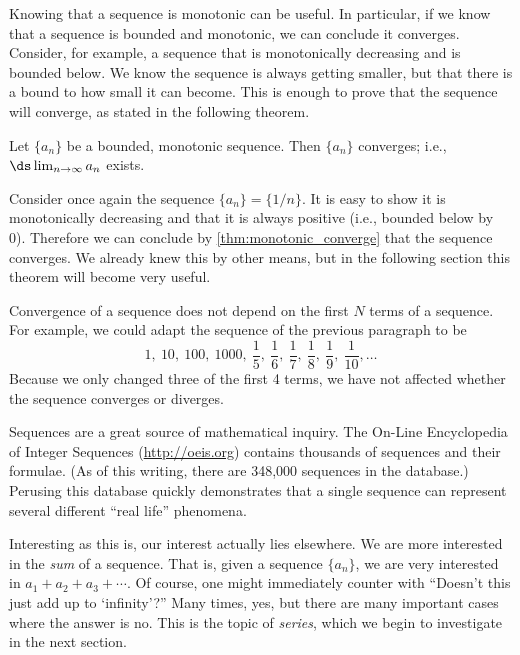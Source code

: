 Knowing that a sequence is monotonic can be useful. In particular, if we know that a sequence is bounded and monotonic, we can conclude it converges. Consider, for example, a sequence that is monotonically decreasing and is bounded below. We know the sequence is always getting smaller, but that there is a bound to how small it can become. This is enough to prove that the sequence will converge, as stated in the following theorem.

\begin{theorem}\label{thm:monotonic_converge}%
Let $\{a_n\}$ be a bounded, monotonic sequence. Then $\{a_n\}$ converges; i.e., $\ds \lim_{n \to\infty}a_n$ exists.
\end{theorem}

Consider once again the sequence $\{a_n\} = \{1/n\}$. It is easy to show it is monotonically decreasing and that it is always positive (i.e., bounded below by 0). Therefore we can conclude by \autoref{thm:monotonic_converge} that the sequence converges. We already knew this by other means, but in the following section this theorem will become very useful.

Convergence of a sequence does not depend on the first $N$ terms of a sequence.  For example, we could adapt the sequence of the previous paragraph to be
\[
 1,\ 10,\ 100,\ 1000,\ \frac15,\ \frac16,\ \frac17,\ \frac18,\ \frac19,\ \frac1{10},
 \dotsc
\]
Because we only changed three of the first 4 terms, we have not affected whether the sequence converges or diverges.

Sequences are a great source of mathematical inquiry. The On-Line Encyclopedia of Integer Sequences (\url{http://oeis.org}) contains thousands of sequences and their formulae. (As of this writing, there are 348,000 sequences in the database.) Perusing this database quickly demonstrates that a single sequence can represent several different ``real life'' phenomena. 

Interesting as this is, our interest actually lies elsewhere. We are more interested in the \emph{sum} of a sequence. That is, given a sequence $\{a_n\}$, we are very interested in $a_1+a_2+a_3+\dotsb$. Of course, one might immediately counter with ``Doesn't this just add up to `infinity'?'' Many times, yes, but there are many important cases where the answer is no. This is the topic of \emph{series}, which we begin to investigate in the next section.

